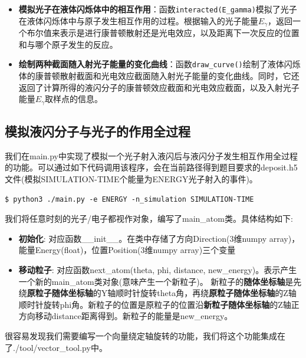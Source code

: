 \documentclass[12pt,a4paper]{article}%
\begin{document}
    \begin{tcolorbox}[width=16cm]
        \begin{itemize}
        \item \textbf{模拟光子在液体闪烁体中的相互作用}：函数\texttt{interacted(E\_gamma)}模拟了光子在液体闪烁体中与原子发生相互作用的过程。根据输入的光子能量$E_\gamma$，返回一个布尔值来表示是进行康普顿散射还是光电效应，以及距离下一次反应的位置和与哪个原子发生的反应。
        \item \textbf{绘制两种截面随入射光子能量的变化曲线}：函数\texttt{draw\_curve()}绘制了液体闪烁体的康普顿散射截面和光电效应截面随入射光子能量的变化曲线。同时，它还返回了计算所得的液闪分子的康普顿效应截面和光电效应截面，以及入射光子能量$E_\gamma$取样点的信息。
        \end{itemize}
    \end{tcolorbox}

    \subsection{模拟液闪分子与光子的作用全过程}
    我们在main.py中实现了模拟一个光子射入液闪后与液闪分子发生相互作用全过程的功能。可以通过如下代码调用该程序，会在当前路径得到题目要求的deposit.h5文件(模拟SIMULATION-TIME个能量为ENERGY光子射入的事件)。
    \begin{lstlisting}[style=mystyle,label=code:bash]
    $ python3 ./main.py -e ENERGY -n_simulation SIMULATION-TIME
    \end{lstlisting}\par
    我们将任意时刻的光子/电子都视作对象，编写了main\_atom类。具体结构如下:
    \begin{tcolorbox}[width=16cm]
        \begin{itemize}
            \item \textbf{初始化}: 对应函数\_\_init\_\_。在类中存储了方向Direction(3维numpy array)，能量Energy(float)，位置Position(3维numpy array)三个变量
            
            \item \textbf{移动粒子}: 对应函数next\_atom(theta, phi, distance, new\_energy)。表示产生一个新的main\_atom类对象(意味产生一个新粒子)。
            新粒子的\textbf{随体坐标轴}是先绕\textbf{原粒子随体坐标轴}的Y轴顺时针旋转theta角，再绕\textbf{原粒子随体坐标轴}的Z轴顺时针旋转phi角。新粒子的位置是原粒子的位置沿\textbf{新粒子随体坐标轴}的Z轴正方向移动distance距离得到。新粒子的能量是new\_energy。
        \end{itemize}
    \end{tcolorbox}
    \par
    很容易发现我们需要编写一个向量绕定轴旋转的功能，我们将这个功能集成在了./tool/vector\_tool.py中。
    
\end{document}
